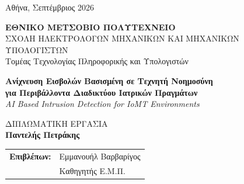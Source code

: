 \vspace{1.35cm}

\noindent Αθήνα, Σεπτέμβριος 2026

\clearpage

\thispagestyle{empty}
\null
\clearpage

\thispagestyle{empty}

\vspace*{-0.55cm}

\begin{center}
  {\large\bfseries ΕΘΝΙΚΟ ΜΕΤΣΟΒΙΟ ΠΟΛΥΤΕΧΝΕΙΟ}\\[0.28em]
  {\normalsize ΣΧΟΛΗ ΗΛΕΚΤΡΟΛΟΓΩΝ ΜΗΧΑΝΙΚΩΝ ΚΑΙ ΜΗΧΑΝΙΚΩΝ ΥΠΟΛΟΓΙΣΤΩΝ}\\[0.18em]
  {\normalsize Τομέας Τεχνολογίας Πληροφορικής και Υπολογιστών}
\end{center}

\vspace{1.5cm}

\begin{center}
  {\large\bfseries Ανίχνευση Εισβολών Βασισμένη σε Τεχνητή Νοημοσύνη\\[0.28em]
         για Περιβάλλοντα Διαδικτύου Ιατρικών Πραγμάτων}\\[0.45em]
  {\normalsize\itshape AI Based Intrusion Detection for IoMT Environments}
\end{center}

\vspace{0.85cm}

\begin{center}
  {\large ΔΙΠΛΩΜΑΤΙΚΗ ΕΡΓΑΣΙΑ}\\[0.55em]
  {\large\bfseries Παντελής Πετράκης}
\end{center}

\vspace{1.55cm}

\noindent
\begin{tabular}{@{}ll@{}}
  \textbf{Επιβλέπων:} & Εμμανουήλ Βαρβαρίγος \\
                      & Καθηγητής Ε.Μ.Π.
\end{tabular}

\vspace{1.15cm}

